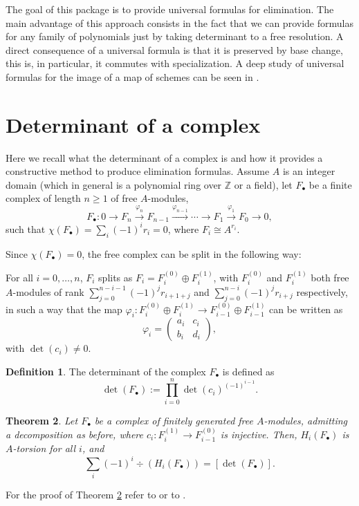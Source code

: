 \documentclass[10pt]{amsart}
\theoremstyle{plain}
\newtheorem{thm}{Theorem}[section]
\theoremstyle{definition}
\newtheorem{defn}[thm]{Definition}
\def\ZZ{{\mathbb{Z}}}
\def\b{\beta}
\def\F.{F_\bullet}
\def\lto{\longrightarrow}
\begin{document}
The goal of this package is to provide universal formulas for elimination. The main advantage of this approach consists in the fact that we can provide formulas for any family of polynomials just by taking determinant to a free resolution. A direct consequence of a universal formula is that it is preserved by base change, this is, in particular, it commutes with specialization. A deep study of universal formulas for the image of a map of schemes can be seen in \cite[Chapter V]{EH00}.

  

\section{Determinant of a complex}\label{secDetComplex}

Here we recall what the determinant of a complex is and how it provides a constructive method to produce elimination formulas. Assume $A$ is an integer domain (which in general is a polynomial ring over $\ZZ$ or a field), let $\F.$ be a finite complex of length $n\geq 1$ of free $A$-modules, 
\[
\F. : 0\lto F_n\stackrel{\varphi_n}{\lto} F_{n-1}\stackrel{\varphi_{n-1}}{\lto}\cdots \lto F_1\stackrel{\varphi_1}{\lto} F_0\lto 0,
\]
such that $\chi(\F.)=\sum_i (-1)^ir_i=0$, where $F_i\cong A^{r_i}$.

\bigskip
Since $\chi(\F.)=0$, the free complex can be split in the following way:

For all $i=0,\hdots,n$, $F_i$ splits as $F_i=F^{(0)}_i\oplus F^{(1)}_i$, with $F^{(0)}_i$ and $F^{(1)}_i$ both free $A$-modules of rank $\sum_{j=0}^{n-i-1}(-1)^jr_{i+1+j}$ and $\sum_{j=0}^{n-i}(-1)^jr_{i+j}$ respectively, in such a way that the map $\varphi_i:F^{(0)}_i\oplus F^{(1)}_i\to F^{(0)}_{i-1}\oplus F^{(1)}_{i-1}$ can be written as 
\[
\varphi_i=\left( \begin{array}{cc} a_i& c_i \\b_i &d_i \end{array}\right),
\]
with $\det(c_i)\neq 0$.

\begin{defn}
The determinant of the complex $\F.$ is defined as
\[
 \det(\F.):=\prod_{i=0}^n\det(c_i)^{(-1)^{i-1}}.
\]
\end{defn}

\begin{thm}\label{thmDetComp}
 Let $\F.$ be a complex of finitely generated free $A$-modules, admitting a decomposition as before, where $c_i: F_i^{(1)}\to F_{i-1}^{(0)}$ is injective. Then, $H_i(\F.)$ is $A$-torsion for all $i$, and 
\[
 \sum_i (-1)^i \div(H_i(\F.)) = [\det(\F.)].
\]
\end{thm}
For the proof of Theorem \ref{thmDetComp} refer to \cite{Cha1} or to \cite{Dem84}.
\end{document}
